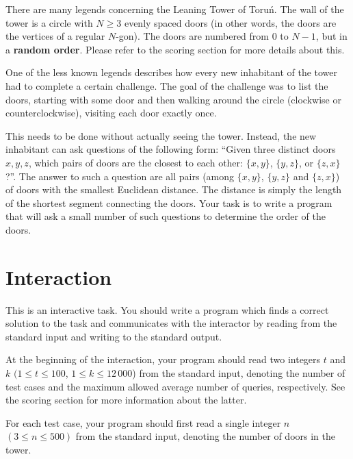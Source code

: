 There are many legends concerning the Leaning Tower of Toruń.
The wall of the tower is a circle with $N\geq 3$ evenly spaced doors (in other
words, the doors are the vertices of a regular $N$-gon). The doors are numbered
from $0$ to $N-1$, but in a \textbf{random order}.
Please refer to the scoring section for more details about this.

One of the less known legends describes how every new inhabitant of
the tower had to complete a certain challenge. The goal of the challenge
was to list the doors, starting with some door and then walking around the circle
(clockwise or counterclockwise), visiting each door exactly once.

This needs to be done without actually seeing the tower.
Instead, the new inhabitant can ask questions of the following form:
``Given three distinct doors $x,y,z$, which pairs of doors are the closest to each other: $\{x,y\}$,
$\{y,z\}$, or $\{z,x\}$?''. The answer to such a question are all pairs (among $\{x,y\}$, $\{y,z\}$ and $\{z,x\}$)
of doors with the smallest Euclidean distance. The distance is simply the length of the shortest
segment connecting the doors.
Your task is to write a program that will ask a small number of such questions
to determine the order of the doors.

\section*{Interaction}
This is an interactive task. You should write a program which finds a correct
solution to the task and communicates with the interactor by reading from
the standard input and writing to the standard output.

At the beginning of the interaction, your program should read two integers
$t$ and $k$ $(1 \leq t \leq 100$, $1\leq k\leq 12\,000$) from the standard input,
denoting the number of test cases and the maximum allowed average number of queries,
respectively. See the scoring section for more information about the latter.

For each test case, your program should first read a single integer $n$ $(3 \leq n \leq 500)$
from the standard input, denoting the number of doors in the tower.

